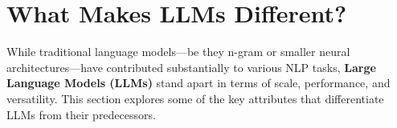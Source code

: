 \section{What Makes LLMs Different?}
\label{sec:llms_difference}

\noindent
While traditional language models—be they n-gram or smaller neural architectures—have contributed substantially to various NLP tasks, \textbf{Large Language Models (LLMs)} stand apart in terms of scale, performance, and versatility. This section explores some of the key attributes that differentiate LLMs from their predecessors.

